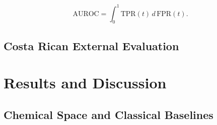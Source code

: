 \documentclass[conference]{IEEEtran}
\newif\ifdraftmode
\newcommand{\draftnote}[1]{%
  \ifdraftmode
    \par\noindent
    \colorbox{yellow!30}{\parbox{\dimexpr\columnwidth-2\fboxsep}{%
      \small\sffamily\textcolor{black!70}{#1}}}%
    \par\smallskip
  \fi
}
\begin{document}
\draftnote{Example metric equation — adapt or delete:}
\begin{equation}
\mathrm{AUROC} = \int_{0}^{1} \mathrm{TPR}(t)\,d\,\mathrm{FPR}(t).
\label{eq:auroc}
\end{equation}

\subsection{Costa Rican External Evaluation}
\label{sec:external}

\draftnote{%
\textbf{Include:}\\
\textbullet\ $\approx$550 agrochemicals from UNA source.\\
\textbullet\ Why qualitative UNA toxicity categories \emph{cannot} be
   arbitrarily converted to BeeQ labels.\\
\textbullet\ Second source with quantitative acute-toxicity values.\\
\textbullet\ Resulting 73 candidate compounds.\\
\textbullet\ Identifier matching, units, duplicates, chemical identity.\\
\textbullet\ Overlap check with 893-molecule BeeQ corpus.\\
\textbullet\ Provenance auditing.\\[4pt]
\textbf{Do not:} call this ``completely independent external validation''
until overlap and provenance have been fully verified.}

\section{Results and Discussion}
\label{sec:results}

\subsection{Chemical Space and Classical Baselines}
\label{sec:results-classical}
\end{document}
